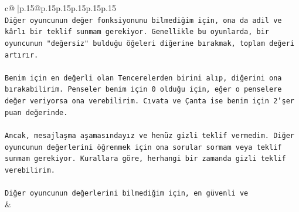 \documentclass{article}
\begin{document}
{\begin{supertabular}{c@{$\;$}|p{.15\linewidth}@{}p{.15\linewidth}p{.15\linewidth}p{.15\linewidth}p{.15\linewidth}p{.15\linewidth}}
{{{\\ 
\texttt{Diğer oyuncunun değer fonksiyonunu bilmediğim için, ona da adil ve kârlı bir teklif sunmam gerekiyor. Genellikle bu oyunlarda, bir oyuncunun "değersiz" bulduğu öğeleri diğerine bırakmak, toplam değeri artırır.} \\
\\ 
\texttt{Benim için en değerli olan Tencerelerden birini alıp, diğerini ona bırakabilirim. Penseler benim için 0 olduğu için, eğer o penselere değer veriyorsa ona verebilirim. Cıvata ve Çanta ise benim için 2'şer puan değerinde.} \\
\\ 
\texttt{Ancak, mesajlaşma aşamasındayız ve henüz gizli teklif vermedim. Diğer oyuncunun değerlerini öğrenmek için ona sorular sormam veya teklif sunmam gerekiyor. Kurallara göre, herhangi bir zamanda gizli teklif verebilirim.} \\
\\ 
\texttt{Diğer oyuncunun değerlerini bilmediğim için, en güvenli ve} \\
            }
        }
    }
    & \\ \\


\end{supertabular}}
\end{document}
